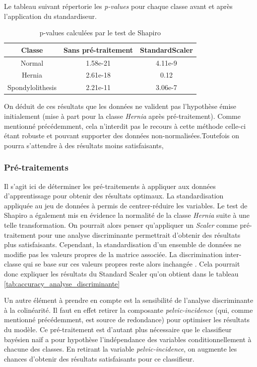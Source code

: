\documentclass[twocolumn,10pt]{article}
\begin{document}
Le tableau suivant répertorie les \textit{p-values} pour chaque classe avant et après l'application du standardiseur.
\begin{table}[htbp]
    \begin{center}
        \caption{\label{tab:p_value_shapiro}p-values calculées par le test de Shapiro}
        \begin{tabular}{c|cc}
          Classe & Sans pré-traitement & StandardScaler \\
            \hline
            Normal & 1.58e-21 & 4.11e-9 \\ 
            Hernia & 2.61e-18 & 0.12 \\
            Spondylolithesis & 2.21e-11 & 3.06e-7 \\ 
        \end{tabular}
    \end{center}
\end{table}

On déduit de ces résultats que les données ne valident pas l'hypothèse émise initialement (mise à part pour la classe \textit{Hernia} après pré-traitement). Comme mentionné précédemment, cela n'interdit pas le recours à cette méthode celle-ci étant robuste et pouvant supporter des données non-normalisées.Toutefois on pourra s'attendre à des résultats moins satisfaisants, 

\subsubsection{Pré-traitements}
Il s'agit ici de déterminer les pré-traitements à appliquer aux données d'apprentissage pour obtenir des résultats optimaux. La standardisation appliquée au jeu de données à permis de centrer-réduire les variables. Le test de Shapiro a également mis en évidence la normalité de la classe \textit{Hernia} suite à une telle transformation. On pourrait alors penser qu'appliquer un \textit{Scaler} comme pré-traitement pour une analyse discriminante permettrait d'obtenir des résultats plus satisfaisants. Cependant, la standardisation d'un ensemble de données ne modifie pas les valeurs propres de la matrice associée. La discrimination inter-classe qui se base sur ces valeurs propres reste alors inchangée \cite{Standardizing_features_when_using_LDA_as_a_pre-processing_step}. Cela pourrait donc expliquer les résultats du Standard Scaler qu'on obtient dans le tableau \ref{tab:accuracy_analyse_discriminante}


Un autre élément à prendre en compte est la sensibilité de l'analyse discriminante à la colinéarité. Il faut en effet retirer la composante
\textit{pelvic-incidence} (qui, comme mentionné précédemment, est source de redondance) pour optimiser les résultats du modèle. Ce pré-traitement est d'autant plus nécessaire que le classifieur bayésien naïf a pour hypothèse l'indépendance des variables conditionnellement à chacune des classes. En retirant la variable \textit{pelvic-incidence}, on augmente les chances d'obtenir des résultats satisfaisants pour ce classifieur.
\end{document}

